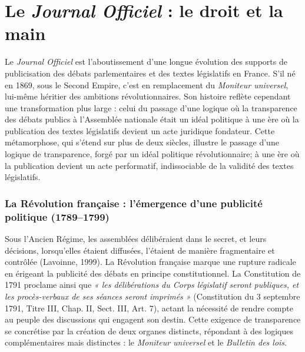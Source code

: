 \section{Le \emph{Journal Officiel} : le droit et la main}

Le \emph{Journal Officiel} est l’aboutissement d’une longue évolution des supports de publicisation des débats parlementaires et des textes législatifs en France. S'il né en 1869, sous le Second Empire, c'est en remplacement du \emph{Moniteur universel}, lui-même héritier des ambitions révolutionnaires. Son histoire reflète cependant une transformation plus large : celui du passage d’une logique où la transparence des débats publics à l'Assemblée nationale était un idéal politique à une ère où la publication des textes législatifs devient un acte juridique fondateur. Cette métamorphose, qui s’étend sur plus de deux siècles, illustre le passage d’une logique de transparence, forgé par un idéal politique révolutionnaire; à une ère où la publication devient un acte performatif, indissociable de la validité des textes législatifs.

\subsubsection{La Révolution française : l’émergence d’une publicité politique (1789–1799)}

Sous l’Ancien Régime, les assemblées délibéraient dans le secret, et leurs décisions, lorsqu’elles étaient diffusées, l’étaient de manière fragmentaire et contrôlée (Lavoinne, 1999). La Révolution française marque une rupture radicale en érigeant la publicité des débats en principe constitutionnel. La Constitution de 1791 proclame ainsi que \emph{« les délibérations du Corps législatif seront publiques, et les procès-verbaux de ses séances seront imprimés »} (Constitution du 3 septembre 1791, Titre III, Chap. II, Sect. III, Art. 7), actant la nécessité de rendre compte au peuple des discussions qui engagent son destin. Cette exigence de transparence se concrétise par la création de deux organes distincts, répondant à des logiques complémentaires mais distinctes : le \emph{Moniteur universel} et le \emph{Bulletin des lois}.

